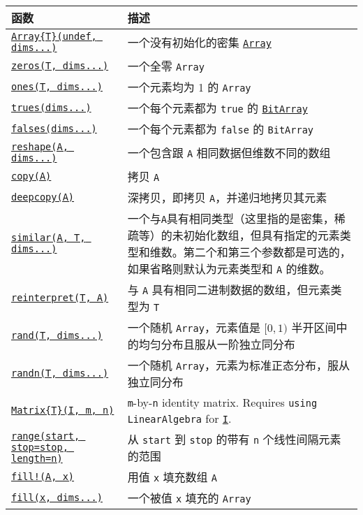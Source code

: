 \begin{table}[h]

\begin{tabulary}{\linewidth}{|L|L|}
\hline
函数 & 描述 \\
\hline
\hyperlink{15492651498431872487}{\texttt{Array\{T\}(undef, dims...)}} & 一个没有初始化的密集 \hyperlink{15492651498431872487}{\texttt{Array}} \\
\hline
\hyperlink{13837674686090348619}{\texttt{zeros(T, dims...)}} & 一个全零 \texttt{Array} \\
\hline
\hyperlink{5858390260510292771}{\texttt{ones(T, dims...)}} & 一个元素均为 1 的 \texttt{Array} \\
\hline
\hyperlink{12844393578243965152}{\texttt{trues(dims...)}} & 一个每个元素都为 \texttt{true} 的 \hyperlink{18015155802543401629}{\texttt{BitArray}} \\
\hline
\hyperlink{12518029339635756199}{\texttt{falses(dims...)}} & 一个每个元素都为 \texttt{false} 的 \texttt{BitArray} \\
\hline
\hyperlink{3388738163419525310}{\texttt{reshape(A, dims...)}} & 一个包含跟 \texttt{A} 相同数据但维数不同的数组 \\
\hline
\hyperlink{15665284441316555522}{\texttt{copy(A)}} & 拷贝 \texttt{A} \\
\hline
\hyperlink{3259459540194502889}{\texttt{deepcopy(A)}} & 深拷贝，即拷贝 \texttt{A}，并递归地拷贝其元素 \\
\hline
\hyperlink{15525808546723795098}{\texttt{similar(A, T, dims...)}} & 一个与\texttt{A}具有相同类型（这里指的是密集，稀疏等）的未初始化数组，但具有指定的元素类型和维数。第二个和第三个参数都是可选的，如果省略则默认为元素类型和 \texttt{A} 的维数。 \\
\hline
\hyperlink{293815781001952115}{\texttt{reinterpret(T, A)}} & 与 \texttt{A} 具有相同二进制数据的数组，但元素类型为 \texttt{T} \\
\hline
\hyperlink{7668863842145012694}{\texttt{rand(T, dims...)}} & 一个随机 \texttt{Array}，元素值是  \([0, 1)\)  半开区间中的均匀分布且服从一阶独立同分布 \footnotemark[1] \\
\hline
\hyperlink{7347069443766288058}{\texttt{randn(T, dims...)}} & 一个随机 \texttt{Array}，元素为标准正态分布，服从独立同分布 \\
\hline
\hyperlink{5448927444601277512}{\texttt{Matrix\{T\}(I, m, n)}} & \texttt{m}-by-\texttt{n} identity matrix. Requires \texttt{using LinearAlgebra} for \hyperlink{15346645596018210602}{\texttt{I}}. \\
\hline
\hyperlink{737600656772861535}{\texttt{range(start, stop=stop, length=n)}} & 从 \texttt{start} 到 \texttt{stop} 的带有 \texttt{n} 个线性间隔元素的范围 \\
\hline
\hyperlink{5162290739791026948}{\texttt{fill!(A, x)}} & 用值 \texttt{x} 填充数组 \texttt{A} \\
\hline
\hyperlink{2836152204730819918}{\texttt{fill(x, dims...)}} & 一个被值 \texttt{x} 填充的 \texttt{Array} \\
\hline
\end{tabulary}

\end{table}




